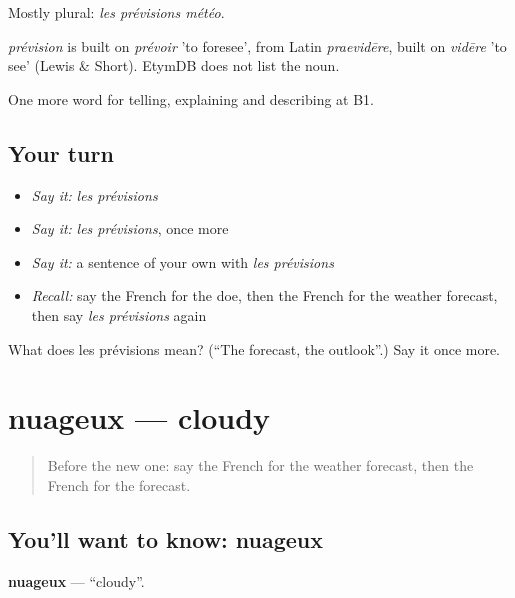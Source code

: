 Mostly plural: \emph{les prévisions météo}.

\begin{cousinweb}
\emph{prévision} is built on \emph{prévoir} 'to foresee', from Latin \emph{praevidēre}, built on \emph{vidēre} 'to see' (Lewis \& Short). EtymDB does not list the noun.
\end{cousinweb}

\begin{grammarlens}[title={What you've built}]
One more word for telling, explaining and describing at B1.
\end{grammarlens}

\subsection*{Your turn}
\begin{itemize}
\raggedright
  \item \emph{Say it:} \emph{les prévisions}
  \item \emph{Say it:} \emph{les prévisions}, once more
  \item \emph{Say it:} a sentence of your own with \emph{les prévisions}
  \item \emph{Recall:} say the French for the doe, then the French for the weather forecast, then say \emph{les prévisions} again
\end{itemize}

\begin{tcolorbox}[breakable,colback=teal!4,colframe=teal!35!black,title={Before you move on}]
What does les prévisions mean? (\textquotedblleft{}The forecast, the outlook\textquotedblright{}.) Say it once more.
\end{tcolorbox}
\section[nuageux]{nuageux — cloudy}

\label{lesson:FR-C460-nuageux}



\begin{quote}
Before the new one: say the French for the weather forecast, then the French for the forecast.
\end{quote}

\subsection*{You'll want to know: nuageux}
\textbf{nuageux} — \textquotedblleft{}cloudy\textquotedblright{}.

